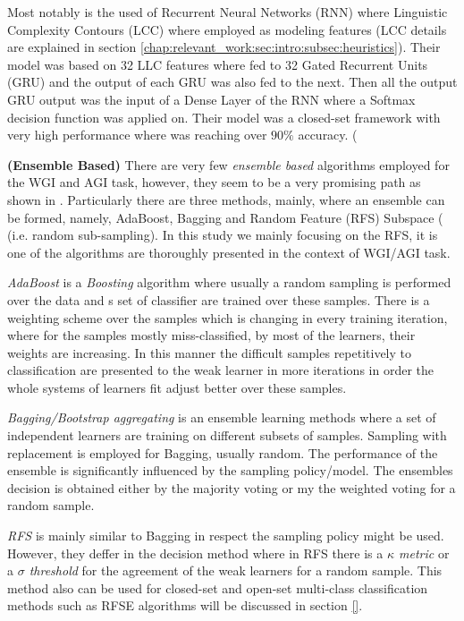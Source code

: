Most notably is the used of Recurrent Neural Networks (RNN) where Linguistic Complexity Contours (LCC) where employed as modeling features (LCC details are explained in section \ref{chap:relevant_work:sec:intro:subsec:heuristics}). Their model was based on 32 LLC features where fed to 32 Gated Recurrent Units (GRU)  and the output of each GRU was also fed to the next. Then all the output GRU output was the input of a Dense Layer of the RNN where a Softmax decision function was applied on. Their model was a closed-set framework with very high performance where was reaching over $90\%$  accuracy. (\parencite{strobel2018text}

\textbf{(Ensemble Based)} 
There are very few \textit{ensemble based} algorithms employed for the WGI and AGI task, however, they seem to be a very promising path as shown in \cite{onan2018ensemble,pritsos2015clef,pritsos2013open,pritsos2018open}. Particularly there are three methods, mainly, where an ensemble can be formed, namely, AdaBoost, Bagging and Random Feature (RFS) Subspace ( (i.e. random sub-sampling). In this study we mainly focusing on the RFS, it is one of the algorithms are thoroughly presented in the context of WGI/AGI task.

\textit{AdaBoost} is a \textit{Boosting} algorithm where usually a random sampling is performed over the data and s set of classifier are trained over these samples. There is a weighting scheme over the samples which is changing in every training iteration, where for the samples mostly miss-classified, by most of the learners, their weights are increasing. In this manner the difficult samples repetitively to classification are presented to the weak learner in more iterations in order the whole systems of learners fit adjust better over these samples.

\textit{Bagging/Bootstrap aggregating} is an ensemble learning methods where a set of independent learners are training on different subsets of samples. Sampling with replacement is employed for Bagging, usually random. The performance of the ensemble is significantly influenced by the sampling policy/model. The ensembles decision is obtained either by the majority voting or my the weighted voting for a random sample.

\textit{RFS } is mainly similar to Bagging in respect the sampling policy might be used. However, they deffer in the decision method where in RFS there is a \textit{$\kappa$ metric} or a \textit{$\sigma$ threshold} for the agreement of the weak learners for a random sample. This method also can be used for closed-set and open-set multi-class classification methods such as RFSE algorithms will be discussed in section \ref{}.

